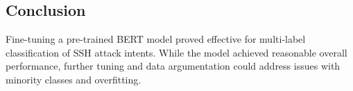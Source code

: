     \subsection{Conclusion}
    
        Fine-tuning a pre-trained BERT model proved effective for multi-label classification of SSH attack intents. While the model achieved reasonable overall performance, further tuning and data argumentation could address issues with minority classes and overfitting.
